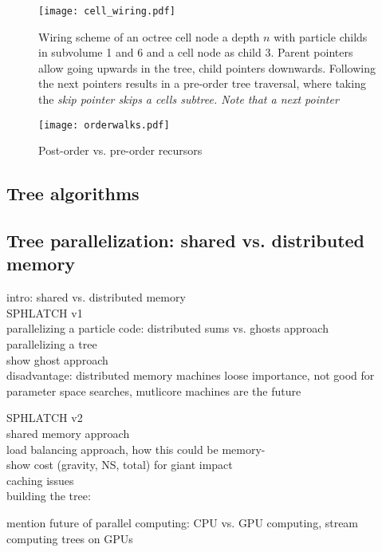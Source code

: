 \begin{figure}[htbp]
\begin{center}
\texttt{[image: cell\_wiring.pdf]}
\caption{Wiring scheme of an octree cell node a depth $n$ with particle childs in subvolume 1 and 6 and a cell node as child 3. Parent pointers allow going upwards in the tree, child pointers downwards. Following the next pointers results in a pre-order tree traversal, where taking the \it{skip} pointer skips a cells subtree. Note that a \it{next} pointer }
\label{fig02walks}
\end{center}
\end{figure}


\begin{figure}[htbp]
\begin{center}
\texttt{[image: orderwalks.pdf]}
\caption{Post-order vs. pre-order recursors}
\label{fig02walks}
\end{center}
\end{figure}

\subsection{Tree algorithms}

\subsection{Tree parallelization: shared vs. distributed memory}
intro: shared vs. distributed memory\\

SPHLATCH v1\\
parallelizing a particle code: distributed sums vs. ghosts approach\\
parallelizing a tree\\
show ghost approach\\

disadvantage: distributed memory machines loose importance, not good for parameter space searches, mutlicore machines are the future


SPHLATCH v2\\
shared memory approach\\
load balancing approach, how this could be memory-\\
show cost (gravity, NS, total) for giant impact\\
caching issues\\

building the tree:

mention future of parallel computing: CPU vs. GPU computing, stream computing
trees on GPUs

